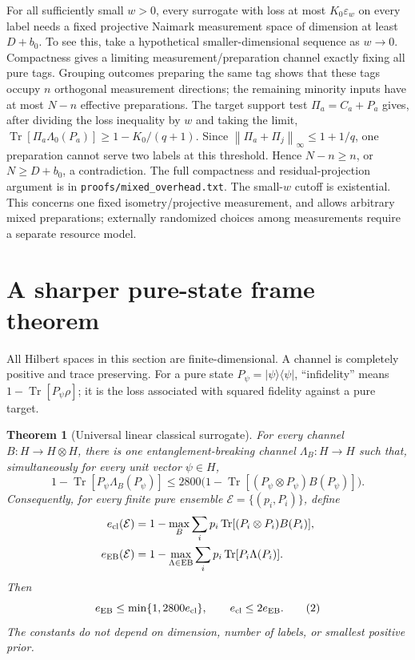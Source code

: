 \documentclass[11pt]{article}
\newtheorem{theorem}{Theorem}
\newcommand{\Tr}{\operatorname{Tr}}
\newcommand{\EB}{\operatorname{EB}}
\newcommand{\norm}[1]{\left\lVert#1\right\rVert}
\begin{document}
For all sufficiently small $w>0$, every surrogate with loss at most $K_0\varepsilon_w$ on every label needs a fixed projective Naimark measurement space of dimension at least $D+b_0$. To see this, take a hypothetical smaller-dimensional sequence as $w\to0$. Compactness gives a limiting measurement/preparation channel exactly fixing all pure tags. Grouping outcomes preparing the same tag shows that these tags occupy $n$ orthogonal measurement directions; the remaining minority inputs have at most $N-n$ effective preparations. The target support test $\Pi_a=C_a+P_a$ gives, after dividing the loss inequality by $w$ and taking the limit,
$\Tr[\Pi_a\Lambda_0(P_a)]\ge1-K_0/(q+1)$. Since $\norm{\Pi_a+\Pi_j}_\infty\le1+1/q$, one preparation cannot serve two labels at this threshold. Hence $N-n\ge n$, or $N\ge D+b_0$, a contradiction. The full compactness and residual-projection argument is in \texttt{proofs/mixed\_overhead.txt}. The small-$w$ cutoff is existential. This concerns one fixed isometry/projective measurement, and allows arbitrary mixed preparations; externally randomized choices among measurements require a separate resource model.

\section{A sharper pure-state frame theorem}\label{sec:clone}

All Hilbert spaces in this section are finite-dimensional. A channel is completely positive and trace preserving. For a pure state $P_\psi=|\psi\rangle\langle\psi|$, ``infidelity'' means $1-\Tr[P_\psi\rho]$; it is the loss associated with squared fidelity against a pure target.

\begin{theorem}[Universal linear classical surrogate]\label{thm:surrogate}
For every channel $B:H\to H\otimes H$, there is one entanglement-breaking channel $\Lambda_B:H\to H$ such that, simultaneously for every unit vector $\psi\in H$,
\[
1-\Tr[P_\psi\Lambda_B(P_\psi)]
\le 2800\bigl(1-\Tr[(P_\psi\otimes P_\psi)B(P_\psi)]\bigr).
\tag{1}
\]
Consequently, for every finite pure ensemble $\mathcal E=\{(p_i,P_i)\}$, define
\begin{align*}
e_{\rm cl}(\mathcal E)&=1-\max_B\sum_i p_i\Tr[(P_i\otimes P_i)B(P_i)],\\
e_{\EB}(\mathcal E)&=1-\max_{\Lambda\in\EB}\sum_i p_i\Tr[P_i\Lambda(P_i)].
\end{align*}
Then
\[
e_{\EB}\le \min\{1,2800 e_{\rm cl}\},\qquad e_{\rm cl}\le 2e_{\EB}.
\tag{2}
\]
The constants do not depend on dimension, number of labels, or smallest positive prior.
\end{theorem}
\end{document}
